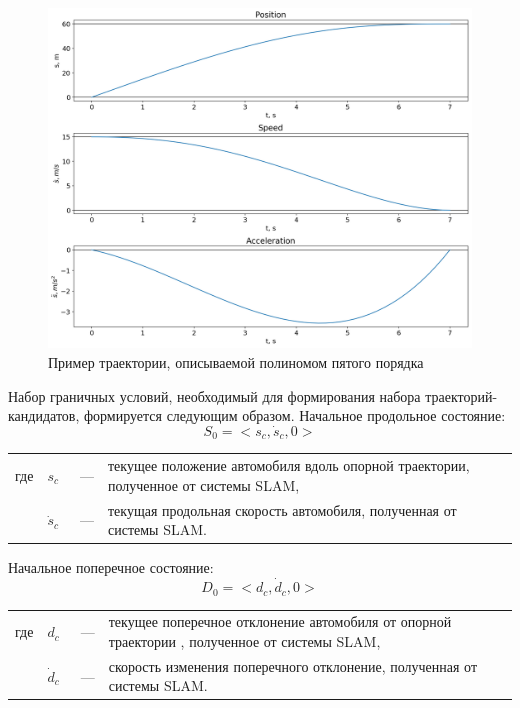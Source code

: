 \begin{figure}[h]
      \centering
      \includegraphics[width=\linewidth]{images/quintic_example}
      \caption{Пример траектории, описываемой полиномом пятого порядка}
      \label{img:quntic_example}
\end{figure}

Набор граничных условий, необходимый для формирования набора траекторий-кандидатов, формируется следующим образом.
Начальное продольное состояние:
\begin{equation}
      S_0 = <s_c, \dot{s}_c, 0>
\end{equation}
\noindent\begin{tabularx}{\linewidth}{lllX}
      где & $s_c$       &~---& текущее положение автомобиля вдоль опорной траектории, полученное от системы SLAM, \\
          & $\dot{s}_c$ &~---& текущая продольная скорость автомобиля, полученная от системы SLAM.
\end{tabularx}

Начальное поперечное состояние:
\begin{equation}
      D_0 = <d_c, \dot{d}_c, 0>
\end{equation}
\noindent\begin{tabularx}{\linewidth}{lllX}
      где & $d_c$       &~---& текущее поперечное отклонение автомобиля от опорной траектории , полученное от системы SLAM, \\
          & $\dot{d}_c$ &~---& скорость изменения поперечного отклонение, полученная от системы SLAM.
\end{tabularx}

